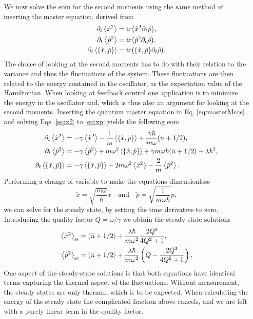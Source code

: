 We now solve the \gls{eom} for the second moments using the same method of inserting the master equation, derived from
\begin{align}
    \dt\expval{\xop^2} &= \tr(\xop^2 \dt \dmatrix)\label{eq:x2}, \\
    \dt\expval{\pop^2} &= \tr(\pop^2 \dt \dmatrix)\label{eq:p2},\\
    \dt\expval{\acomm{\xop}{\pop}} &= \tr(\acomm{\xop}{\pop} \dt \dmatrix). \label{eq:xp}
\end{align}
The choice of looking at the second moments has to do with their relation to the variance and thus the fluctuations of the system. These fluctuations are then related to the energy contained in the oscillator, as the expectation value of the Hamiltonian. When looking at feedback control one application is to minimize the energy in the oscillator and, which is thus also an argument for looking at the second moments. Inserting the quantum master equation in Eq. \eqref{eq:masterMeas} and solving Eqs. \eqref{eq:x2} to \eqref{eq:xp} yields the following \gls{eom}
\begin{align}
    \dt\expval{\xop^2} &= - \gamma \expval{\xop^2} - \frac{1}{m}\expval{\acomm{\xop}{\pop}} + \frac{\gamma \hbar}{m\omega}(\nbar + 1/2),\\
    \dt\expval{\pop^2} &= -\gamma \expval{\pop^2} + m\omega^2 \expval{\acomm{\xop}{\pop}} + \gamma m \omega\hbar (\nbar + 1/2) + \lambda \hbar^2,\\
    \dt\expval{\acomm{\xop}{\pop}} &= -\gamma \expval{\acomm{\xop}{\pop}} + 2 m \omega^2 \expval{\xop^2} - \frac{2}{m} \expval{\pop^2}.
\end{align}
Performing a change of variable to make the equations dimensionless
\begin{equation}
    \tilde{x} = \sqrt{\frac{m\omega}{\hbar}} x \quad \text{and} \quad \tilde{p} = \sqrt{\frac{1}{m \omega \hbar}} p ,
\end{equation}
we can solve for the steady state, by setting the time derivative to zero. Introducing the quality factor $Q = \omega / \gamma$ we obtain the steady-state solutions
\begin{align}
    \expval{\tilde{x}^2}_\mathrm{ss} &= (\bar{n} + 1/2) + \frac{\lambda \hbar}{m \omega^2} \frac{2 Q^3}{4Q^2 + 1}, \label{eq:x2ss}\\
    \expval{\tilde{p}^2}_\mathrm{ss} &= (\bar{n} + 1/2) + \frac{\lambda \hbar}{m \omega^2} \left( Q - \frac{2Q^3}{4Q^2 + 1} \right) \label{eq:p2ss},
\end{align}
One aspect of the steady-state solutions is that both equations have identical terms capturing the thermal aspect of the fluctuations. Without measurement, the steady states are only thermal, which is to be expected. When calculating the energy of the steady state the complicated fraction above cancels, and we are left with a purely linear term in the quality factor.
